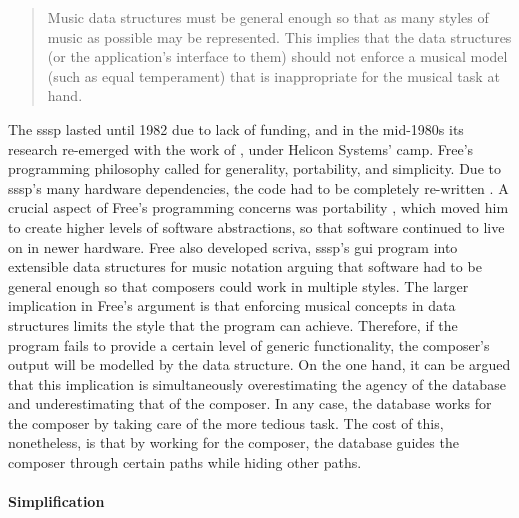 	\begin{quote}
		Music data structures must be general enough so that as many styles of music as possible may be represented. This implies that the data structures (or the application's interface to them) should not enforce a musical model (such as equal temperament) that is inappropriate for the musical task at hand. \parencite[318]{icmc/bbp2372.1987.046}
	\end{quote}

	The \gls{sssp} lasted until 1982 due to lack of funding, and in the mid-1980s its research re-emerged with the work of \textcites{DBLP:conf/icmc/FreeV86}{icmc/bbp2372.1987.046}{DBLP:conf/icmc/FreeV88}, under Helicon Systems' \gls{camp}. Free's programming philosophy called for generality, portability, and simplicity. Due to \gls{sssp}'s many hardware dependencies, the code had to be completely re-written \parencite{DBLP:conf/icmc/FreeV86}. A crucial aspect of Free's programming concerns was portability , which moved him to create higher levels of software abstractions, so that software continued to live on in newer hardware. Free also developed \gls{scriva}, \gls{sssp}'s \gls{gui} program into extensible data structures for music notation arguing that software had to be general enough so that composers could work in multiple styles. The larger implication in Free's argument is that enforcing musical concepts in data structures limits the style that the program can achieve. Therefore, if the program fails to provide a certain level of generic functionality, the composer's output will be modelled by the data structure. On the one hand, it can be argued that this implication is simultaneously overestimating the agency of the database and underestimating that of the composer. In any case, the database works for the composer by taking care of the more tedious task. The cost of this, nonetheless, is that by working for the composer, the database guides the composer through certain paths while hiding other paths.

	\paragraph{Simplification}
	\label{computer:vanilla}

